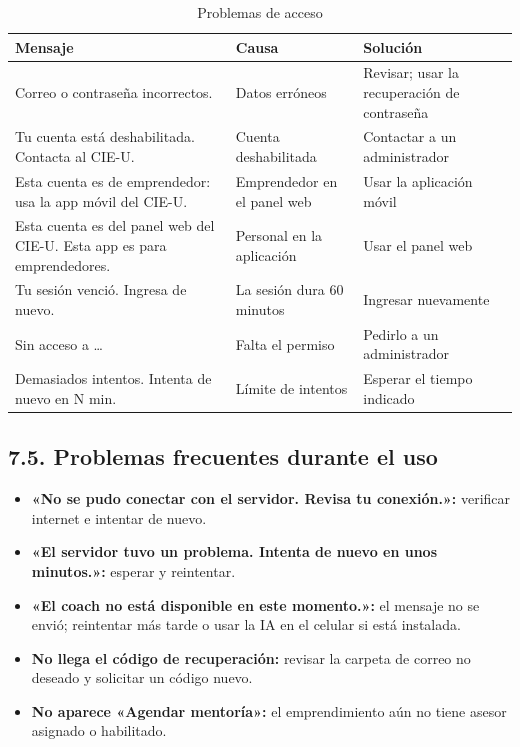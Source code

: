 \documentclass[12pt,letterpaper]{article}
\begin{document}
\begin{table}[H]\singlespacing\small
\caption{Problemas de acceso}
\begin{tabularx}{\textwidth}{XXX}
\toprule
\textbf{Mensaje} & \textbf{Causa} & \textbf{Solución} \\
\midrule
\relax Correo o contraseña incorrectos. & Datos erróneos & Revisar; usar la recuperación de contraseña \\
\relax Tu cuenta está deshabilitada. Contacta al CIE-U. & Cuenta deshabilitada & Contactar a un administrador \\
\relax Esta cuenta es de emprendedor: usa la app móvil del CIE-U. & Emprendedor en el panel web & Usar la aplicación móvil \\
\relax Esta cuenta es del panel web del CIE-U. Esta app es para emprendedores. & Personal en la aplicación & Usar el panel web \\
\relax Tu sesión venció. Ingresa de nuevo. & La sesión dura 60 minutos & Ingresar nuevamente \\
\relax Sin acceso a \ldots{} & Falta el permiso & Pedirlo a un administrador \\
\relax Demasiados intentos. Intenta de nuevo en N min. & Límite de intentos & Esperar el tiempo indicado \\
\bottomrule
\end{tabularx}
\end{table}

\subsection*{7.5. Problemas frecuentes durante el uso}


\begin{itemize}
\item \textbf{«No se pudo conectar con el servidor. Revisa tu conexión.»:} verificar internet e intentar de nuevo.
\item \textbf{«El servidor tuvo un problema. Intenta de nuevo en unos minutos.»:} esperar y reintentar.
\item \textbf{«El coach no está disponible en este momento.»:} el mensaje no se envió; reintentar más tarde o usar la IA en el celular si está instalada.
\item \textbf{No llega el código de recuperación:} revisar la carpeta de correo no deseado y solicitar un código nuevo.
\item \textbf{No aparece «Agendar mentoría»:} el emprendimiento aún no tiene asesor asignado o habilitado.
\end{itemize}
\end{document}
